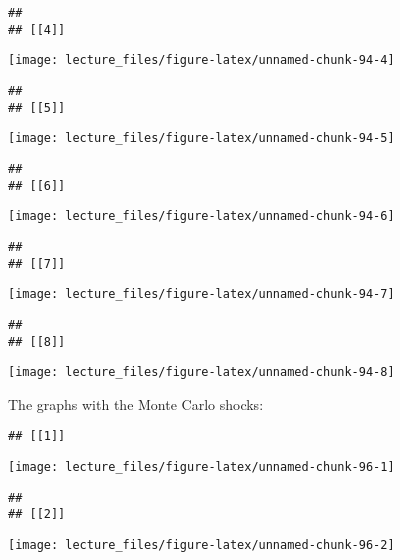 \documentclass[
]{book}
\begin{document}
\begin{verbatim}
## 
## [[4]]
\end{verbatim}

\begin{center}\texttt{[image: lecture\_files/figure-latex/unnamed-chunk-94-4]} \end{center}

\begin{verbatim}
## 
## [[5]]
\end{verbatim}

\begin{center}\texttt{[image: lecture\_files/figure-latex/unnamed-chunk-94-5]} \end{center}

\begin{verbatim}
## 
## [[6]]
\end{verbatim}

\begin{center}\texttt{[image: lecture\_files/figure-latex/unnamed-chunk-94-6]} \end{center}

\begin{verbatim}
## 
## [[7]]
\end{verbatim}

\begin{center}\texttt{[image: lecture\_files/figure-latex/unnamed-chunk-94-7]} \end{center}

\begin{verbatim}
## 
## [[8]]
\end{verbatim}

\begin{center}\texttt{[image: lecture\_files/figure-latex/unnamed-chunk-94-8]} \end{center}

The graphs with the Monte Carlo shocks:

\begin{verbatim}
## [[1]]
\end{verbatim}

\begin{center}\texttt{[image: lecture\_files/figure-latex/unnamed-chunk-96-1]} \end{center}

\begin{verbatim}
## 
## [[2]]
\end{verbatim}

\begin{center}\texttt{[image: lecture\_files/figure-latex/unnamed-chunk-96-2]} \end{center}
\end{document}
